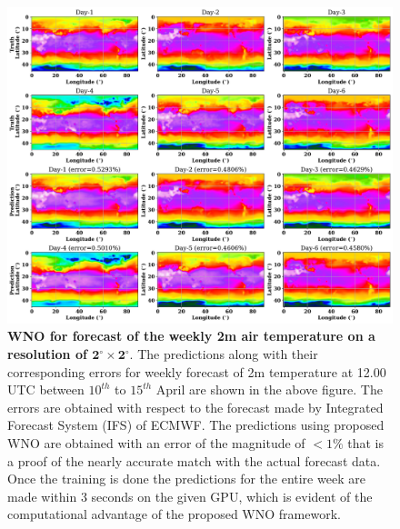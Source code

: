 \documentclass{article}
\begin{document}
\begin{figure}[ht!]
	\centering
	\includegraphics[width=\textwidth]{ERA5_t2m_time.pdf}
	\caption{\textbf{WNO for forecast of the weekly 2m air temperature on a resolution of ${\mathbf{2^{\circ} \times 2^{\circ}}}$}. The predictions along with their corresponding errors for weekly forecast of 2m temperature at 12.00 UTC between $10^{th}$ to $15^{th}$ April are shown in the above figure. The errors are obtained with respect to the forecast made by Integrated Forecast System (IFS) of ECMWF. The predictions using proposed WNO are obtained with an error of the magnitude of $<1 \%$ that is a proof of the nearly accurate match with the actual forecast data. Once the training is done the predictions for the entire week are made within 3 seconds on the given GPU, which is evident of the computational advantage of the proposed WNO framework.}
	\label{fig_era5_time}
\end{figure}
\end{document}

